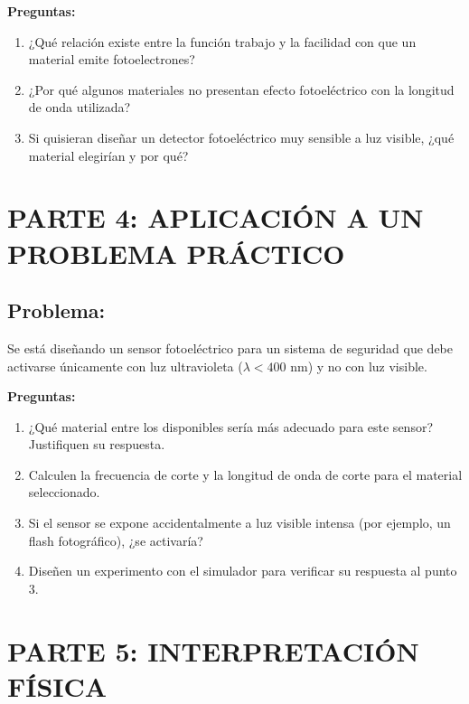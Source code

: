 \documentclass[12pt,a4paper]{article}
\begin{document}
	\begin{preguntabox}
		\textbf{Preguntas:}
		\begin{enumerate}
			\item ¿Qué relación existe entre la función trabajo y la facilidad con que un material emite fotoelectrones?
			\item ¿Por qué algunos materiales no presentan efecto fotoeléctrico con la longitud de onda utilizada?
			\item Si quisieran diseñar un detector fotoeléctrico muy sensible a luz visible, ¿qué material elegirían y por qué?
		\end{enumerate}
	\end{preguntabox}
	
	\newpage
	
	\section{PARTE 4: APLICACIÓN A UN PROBLEMA PRÁCTICO}
	
	\subsection{Problema:}
	Se está diseñando un sensor fotoeléctrico para un sistema de seguridad que debe activarse únicamente con luz ultravioleta ($\lambda < 400$ nm) y no con luz visible.
	
	\begin{preguntabox}
		\textbf{Preguntas:}
		\begin{enumerate}
			\item ¿Qué material entre los disponibles sería más adecuado para este sensor? Justifiquen su respuesta.
			\item Calculen la frecuencia de corte y la longitud de onda de corte para el material seleccionado.
			\item Si el sensor se expone accidentalmente a luz visible intensa (por ejemplo, un flash fotográfico), ¿se activaría?
			\item Diseñen un experimento con el simulador para verificar su respuesta al punto 3.
		\end{enumerate}
	\end{preguntabox}
	
	\section{PARTE 5: INTERPRETACIÓN FÍSICA}
	
\end{document}
